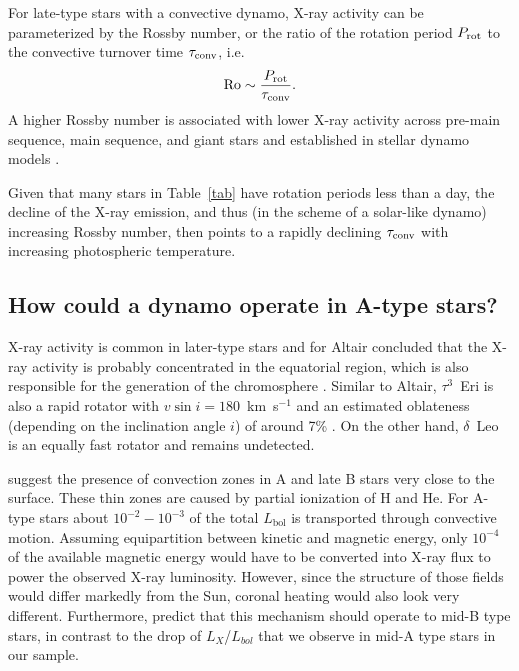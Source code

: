 \documentclass[linenumbers]{aastex631}
\begin{document}
For late-type stars with a convective dynamo, X-ray activity can be parameterized by the Rossby number, or the ratio of the rotation period $P_{\rm rot}$ to the convective turnover time $\tau_{\rm conv}$, i.e.
\begin{equation}
{\rm Ro} \sim \frac{P_{\rm rot}}{\tau_{\rm conv}}. \label{eqn:ro}
\end{equation}
A higher Rossby number is associated with lower X-ray activity across pre-main sequence, main sequence, and giant stars \citep{Preibisch+2005, Pizzolato+2003, Gondoin+2005,2011ApJ...743...48W} and established in stellar dynamo models \citep[e.g.][]{Brandenburg+1998}.

Given that many stars in Table~\ref{tab} have rotation periods less than a day, the decline of the X-ray emission, and thus (in the scheme of a solar-like dynamo) increasing Rossby number, then points to a rapidly declining $\tau_{\rm conv}$ with increasing photospheric temperature. 


\subsection{How could a dynamo operate in A-type stars?}
\label{sect:dynamos}

X-ray activity is common in later-type stars and for Altair
\citet{2009A&A...497..511R} concluded that the X-ray activity is
probably concentrated in the equatorial region, which is also
responsible for the generation of the chromosphere
\citep{1995ApJ...439.1011F}. Similar to Altair, $\tau^3$~Eri is also a
rapid rotator with $v\sin i=180$~km~s$^{-1}$ and an estimated oblateness
(depending on the inclination angle $i$) of around 7\%
\citep{2012A&ARv..20...51V}. On the other hand, $\delta$~Leo is an
equally fast rotator and remains undetected.

\citet{2019ApJ...883..106C} suggest the presence of 
convection zones in A and late B stars very close to the surface. These thin zones are caused
by partial ionization of H and He. For A-type stars about $10^{-2}-10^{-3}$ of the total $L_\mathrm{bol}$ is transported through convective motion. Assuming equipartition between kinetic and magnetic energy, only $10^{-4}$ of the available magnetic energy would have to be converted into X-ray flux to power the observed X-ray luminosity. However, since the structure of those fields would differ markedly from the Sun, coronal heating would also look very different. Furthermore, \citet{2019ApJ...883..106C} predict that this mechanism should operate to mid-B type stars, in contrast to the drop of $L_X$/$L_{bol}$ that we observe in mid-A type stars in our sample.
\end{document}
